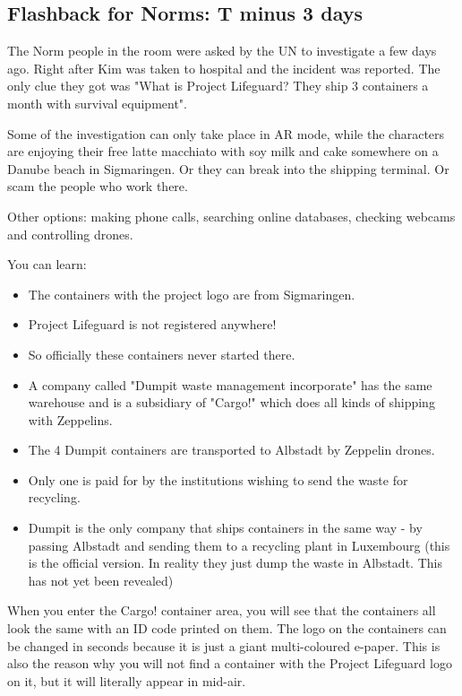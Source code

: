\subsection{Flashback for Norms: T minus 3 days}

The Norm people in the room were asked by the UN to investigate a few days ago. Right after Kim was taken to hospital and the incident was reported. The only clue they got was "What is Project Lifeguard? They ship 3 containers a month with survival equipment".

Some of the investigation can only take place in AR mode, while the characters are enjoying their free latte macchiato with soy milk and cake somewhere on a Danube beach in Sigmaringen. Or they can break into the shipping terminal. Or scam the people who work there.

Other options: making phone calls, searching online databases, checking webcams and controlling drones.

You can learn:

\begin{itemize}
    \item The containers with the project logo are from Sigmaringen.
    \item Project Lifeguard is not registered anywhere!
    \item So officially these containers never started there.
    \item A company called "Dumpit waste management incorporate" has the same warehouse and is a subsidiary of "Cargo!" which does all kinds of shipping with Zeppelins.
    \item The 4 Dumpit containers are transported to Albstadt by Zeppelin drones.
    \item Only one is paid for by the institutions wishing to send the waste for recycling.
    \item Dumpit is the only company that ships containers in the same way - by passing Albstadt and sending them to a recycling plant in Luxembourg (this is the official version. In reality they just dump the waste in Albstadt. This has not yet been revealed)
\end{itemize}

When you enter the Cargo! container area, you will see that the containers all look the same with an ID code printed on them. The logo on the containers can be changed in seconds because it is just a giant multi-coloured e-paper. This is also the reason why you will not find a container with the Project Lifeguard logo on it, but it will literally appear in mid-air.

